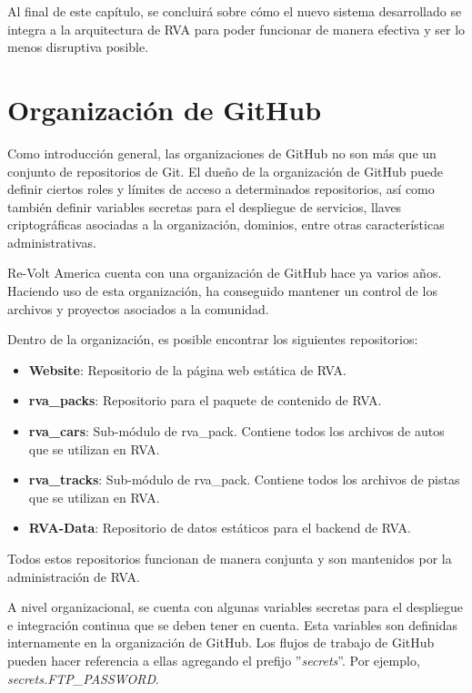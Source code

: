 Al final de este capítulo, se concluirá sobre cómo el nuevo sistema desarrollado se integra a la arquitectura de RVA para poder funcionar de manera efectiva y ser lo menos  disruptiva posible.

\section{Organización de GitHub}
Como introducción general, las organizaciones de GitHub no son más que un conjunto de repositorios de Git. El dueño de la organización de GitHub puede definir ciertos roles y límites de acceso a determinados repositorios, así como también definir variables secretas para el despliegue de servicios, llaves criptográficas asociadas a la organización, dominios, entre otras características administrativas.

Re-Volt America cuenta con una organización de GitHub hace ya varios años. Haciendo uso de esta organización, ha conseguido mantener un control de los archivos y proyectos asociados a la comunidad.

Dentro de la organización, es posible encontrar los siguientes repositorios:

\begin{itemize}
  \item \textbf{Website}: Repositorio de la página web estática de RVA.
  \item \textbf{rva\_packs}: Repositorio para el paquete de contenido de RVA.
  \item \textbf{rva\_cars}: Sub-módulo de rva\_pack. Contiene todos los archivos de autos que se utilizan en RVA.
  \item \textbf{rva\_tracks}: Sub-módulo de rva\_pack. Contiene todos los archivos de pistas que se utilizan en RVA.
  \item \textbf{RVA-Data}: Repositorio de datos estáticos para el backend de RVA.
\end{itemize}

Todos estos repositorios funcionan de manera conjunta y son mantenidos por la administración de RVA.

A nivel organizacional, se cuenta con algunas variables secretas para el despliegue e integración continua que se deben tener en cuenta. Esta variables son definidas internamente en la organización de GitHub. Los flujos de trabajo de GitHub pueden hacer referencia a ellas agregando el prefijo ''\textit{secrets}''. Por ejemplo, \textit{secrets.FTP\_PASSWORD}.

